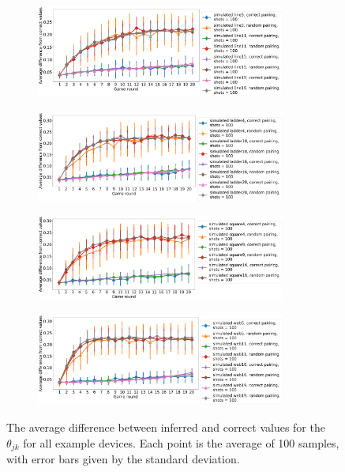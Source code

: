 \documentclass[aps,prl,twocolumn,showpacs,preprintnumbers]{revtex4-1}
\begin{document}
\begin{figure}
    \centering
    \begin{subfigure}[b]{\textwidth}
        \includegraphics[width=0.9\textwidth]{figures/line_diff.png}
    \end{subfigure}
    \begin{subfigure}[b]{\textwidth}
        \includegraphics[width=0.9\textwidth]{figures/ladder_diff.png}
    \end{subfigure}
    \begin{subfigure}[b]{\textwidth}
        \includegraphics[width=0.9\textwidth]{figures/square_diff.png}
    \end{subfigure}
    \begin{subfigure}[b]{\textwidth}
        \includegraphics[width=0.9\textwidth]{figures/web_diff.png}
    \end{subfigure}
    \caption{The average difference between inferred and correct values for the $\theta_{jk}$ for all example devices. Each point is the average of 100 samples, with error bars given by the standard deviation.}\label{fig:example_diff}
\end{figure}
\pagebreak
\end{document}
